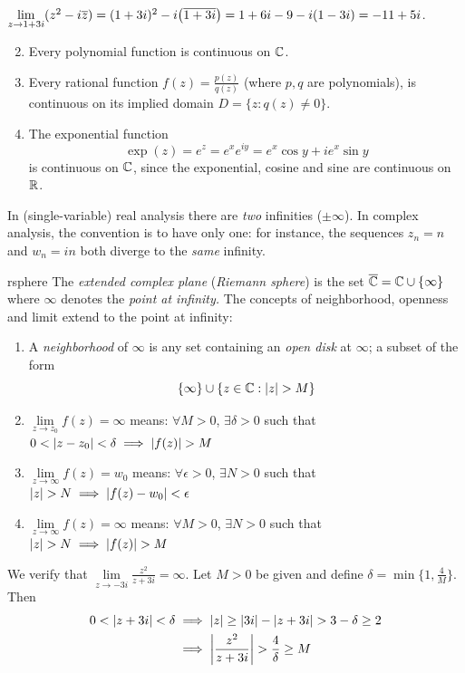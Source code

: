 \begin{examples}{}{}
	\exstart $\lim\limits_{z\to 1+3i}(z^2-i\overline{z}) =(1+3i)^2-i\bigl(\overline{1+3i}\bigr) =1+6i-9-i(1-3i)=-11+5i$.
	\begin{enumerate}\setcounter{enumi}{1}
	  \item Every polynomial function is continuous on $\mathbb{C}$.
	  \item Every rational function $f(z)=\frac{p(z)}{q(z)}$ (where $p,q$ are polynomials), is continuous on its implied domain $D=\{z:q(z)\neq 0\}$.
	  \item The exponential function
	  \[
	  	\exp(z)=e^z=e^xe^{iy}=e^x\cos y+ie^x\sin y
	  \]
	  is continuous on $\mathbb{C}$, since the exponential, cosine and sine are continuous on $\mathbb{R}$.
	\end{enumerate}
\end{examples}

\vfil\goodbreak



In (single-variable) real analysis there are \emph{two} infinities ($\pm\infty$). In complex analysis, the convention is to have only one: for instance, the sequences $z_n=n$ and $w_n=in$ both diverge to the \emph{same} infinity.

\begin{defn}{}{rsphere}
	The \emph{extended complex plane} (\emph{Riemann sphere}) is the set $\overline{\mathbb{C}}=\mathbb{C}\cup\{\infty\}$ where $\infty$ denotes the \emph{point at infinity.} The concepts of neighborhood, openness and limit extend to the point at infinity:
	\begin{enumerate}
	  \item A \emph{neighborhood} of $\infty$ is any set containing an \emph{open disk} at $\infty$; a subset of the form
		\[
			\{\infty\}\cup\{z\in\C:\nm{z}>M\}
		\]
	  \item $\lim\limits_{z\to z_0}f(z)=\infty$ means: $\forall M>0$, $\exists \delta>0$ such that $0<\nm{z-z_0}<\delta \implies \nm{f(z)}>M$
	  \item $\lim\limits_{z\to \infty}f(z)=w_0$ means: $\forall \epsilon>0$, $\exists N>0$ such that $\nm{z}>N \implies \nm{f(z)-w_0}<\epsilon$
	  \item $\lim\limits_{z\to\infty}f(z)=\infty$ means: $\forall M>0$, $\exists N>0$ such that $\nm{z}>N\implies \nm{f(z)}>M$
	\end{enumerate}
\end{defn}

\begin{example}{}{}
	We verify that $\lim\limits_{z\to -3i}\frac{z^2}{z+3i}=\infty$. Let $M>0$ be given and define $\delta=\min\{1,\frac 4{M}\}$. Then
  \begin{align*}
  	0<\nm{z+3i}<\delta&\implies \nm z\ge \nm{3i}-\nm{z+3i}>3-\delta\ge 2\\
  	&\implies\nm{\frac{z^2}{z+3i}} > \frac{4}{\delta} \ge M
  \end{align*}
\end{example}


